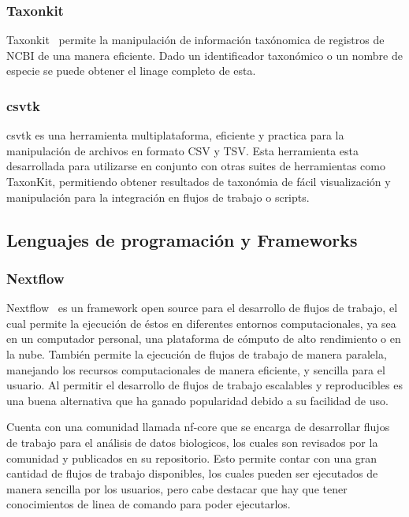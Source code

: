 

\subsubsection{Taxonkit}
Taxonkit~\cite{SHEN2021844} permite la manipulación de información taxónomica de registros de NCBI de una manera eficiente. Dado un identificador taxonómico o un nombre de especie se puede obtener el linage completo de esta.

\subsubsection{csvtk}
csvtk es una herramienta multiplataforma, eficiente y practica para la manipulación de archivos en formato CSV y TSV. Esta herramienta esta desarrollada para utilizarse en conjunto con otras suites de herramientas como TaxonKit, permitiendo obtener resultados de taxonómia de fácil visualización y manipulación para la integración en flujos de trabajo o scripts.
\subsection{Lenguajes de programación y Frameworks}
\subsubsection{Nextflow}
Nextflow~\cite{di2017nextflow} es un framework open source para el desarrollo de flujos de trabajo, el cual permite la ejecución de éstos en diferentes entornos computacionales, ya sea en un computador personal, una plataforma de cómputo de alto rendimiento o en la nube. También permite la ejecución de flujos de trabajo de manera paralela, manejando los recursos computacionales de manera eficiente, y sencilla para el usuario.
 Al permitir el desarrollo de flujos de trabajo escalables y reproducibles es una buena alternativa que ha ganado popularidad debido a su facilidad de uso.

Cuenta con una comunidad llamada nf-core que se encarga de desarrollar flujos de trabajo para el análisis de datos biologicos, los cuales son revisados por la comunidad y publicados en su repositorio. Esto permite contar con una gran cantidad de flujos de trabajo disponibles, los cuales pueden ser ejecutados de manera sencilla por los usuarios, pero cabe destacar que hay que tener conocimientos de linea de comando para poder ejecutarlos.



